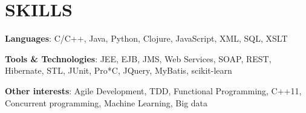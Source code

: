 \documentclass[10pt]{article}
\begin{document}
\section*{SKILLS}
\begin{cvitem}
\textbf{Languages}: C/C++, Java, Python, Clojure, JavaScript, XML, SQL, XSLT\par
\end{cvitem}
\begin{cvitem}
\textbf{Tools \& Technologies}: JEE, EJB, JMS, Web Services, SOAP, REST, Hibernate, STL, JUnit, Pro*C, JQuery, MyBatis, scikit-learn\par
\end{cvitem}
\begin{cvitem}
\textbf{Other interests}: Agile Development, TDD, Functional Programming, C++11, Concurrent programming, Machine Learning, Big data\par
\end{cvitem}
\end{document}
